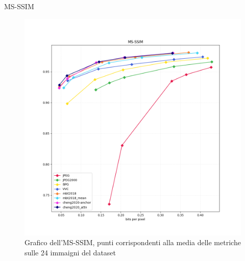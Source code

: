     \begin{frame}{MS-SSIM}
        \begin{figure}[t!]
            \centering
            \includegraphics[width=0.57\textheight]{Immagini/METRICS/MS-SSIM.png}
            \caption{Grafico dell'MS-SSIM\footnotemark[1], punti corrispondenti alla media delle metriche sulle 24 immaigni del dataset}
            \label{fig:GraphMS-SSIM}
        \end{figure}
    \end{frame}

